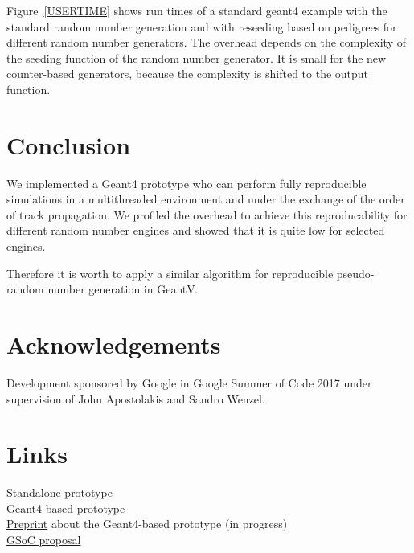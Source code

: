 \documentclass[a4paper, 12pt]{article} %
\begin{document}
  Figure~\ref{USERTIME} shows run times of a standard geant4 example with the standard random number generation and with reseeding based on pedigrees for different random number generators.
  The overhead depends on the complexity of the seeding function of the random number generator.
  It is small for the new counter-based generators,
  because the complexity is shifted to the output function.
    
 \section*{ Conclusion }
 
  We implemented a Geant4 prototype who can perform fully reproducible simulations in a multithreaded environment and under the exchange of the order of track propagation.
  We profiled the overhead to achieve this reproducability for different random number engines and showed that it is quite low for selected engines.
  
  Therefore it is worth to apply a similar algorithm for reproducible pseudo-random number generation in GeantV.
 
 \section*{ Acknowledgements }
 
  Development sponsored by Google in Google Summer of Code 2017 under supervision of John Apostolakis and Sandro Wenzel.
 
 \section*{ Links }
 
  \href{https://bitbucket.org/sd57/pedigree-git}{Standalone prototype}\\
  \href{https://bitbucket.org/sd57/geant4/branch/pedigree}{Geant4-based prototype}\\
  \href{https://sd57.github.io/g4dprng/gsocPreprint.html}{Preprint} about the Geant4-based prototype (in progress)\\
  \href{https://sd57.github.io/g4dprng/gsoc-proposal-Savin.html}{GSoC proposal}\\
  
%  
%  
 
\end{document}
